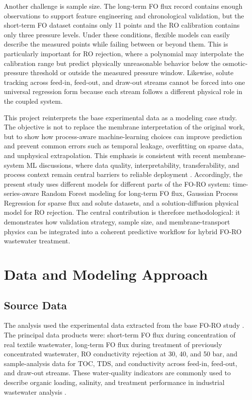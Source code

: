 \documentclass[journal, onecolumn, 12pt]{IEEEtran}
\begin{document}
Another challenge is sample size. The long-term FO flux record contains enough observations to support feature engineering and chronological validation, but the short-term FO dataset contains only 11 points and the RO calibration contains only three pressure levels. Under these conditions, flexible models can easily describe the measured points while failing between or beyond them. This is particularly important for RO rejection, where a polynomial may interpolate the calibration range but predict physically unreasonable behavior below the osmotic-pressure threshold or outside the measured pressure window. Likewise, solute tracking across feed-in, feed-out, and draw-out streams cannot be forced into one universal regression form because each stream follows a different physical role in the coupled system.

This project reinterprets the base experimental data as a modeling case study. The objective is not to replace the membrane interpretation of the original work, but to show how process-aware machine-learning choices can improve prediction and prevent common errors such as temporal leakage, overfitting on sparse data, and unphysical extrapolation. This emphasis is consistent with recent membrane-system ML discussions, where data quality, interpretability, transferability, and process context remain central barriers to reliable deployment \cite{b15}. Accordingly, the present study uses different models for different parts of the FO-RO system: time-series-aware Random Forest modeling for long-term FO flux, Gaussian Process Regression for sparse flux and solute datasets, and a solution-diffusion physical model for RO rejection. The central contribution is therefore methodological: it demonstrates how validation strategy, sample size, and membrane-transport physics can be integrated into a coherent predictive workflow for hybrid FO-RO wastewater treatment.

\section{Data and Modeling Approach}
\subsection{Source Data}
The analysis used the experimental data extracted from the base FO-RO study \cite{b1}. The principal data products were: short-term FO flux during concentration of real textile wastewater, long-term FO flux during treatment of previously concentrated wastewater, RO conductivity rejection at 30, 40, and 50 bar, and sample-analysis data for TOC, TDS, and conductivity across feed-in, feed-out, and draw-out streams. These water-quality indicators are commonly used to describe organic loading, salinity, and treatment performance in industrial wastewater analysis \cite{b8,b9}.
\end{document}
